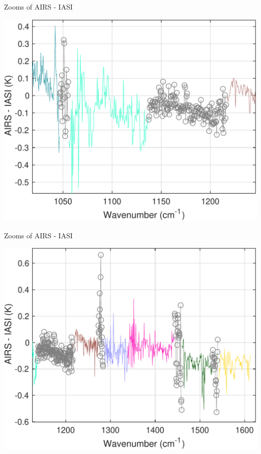 \documentclass[10pt,t]{beamer}
\begin{document}
\begin{frame}[label={sec:org53f6c55}]{Zooms of AIRS - IASI}
\begin{center}
\includegraphics[width=0.8\linewidth]{./Figs/Pdf/sno_airs_m_iasi_with_fill_lwzoom4.pdf}
\end{center}
\end{frame}
\begin{frame}[label={sec:org1c87cfb}]{Zooms of AIRS - IASI}
\begin{center}
\includegraphics[width=0.8\linewidth]{./Figs/Pdf/sno_airs_m_iasi_with_fill_mwzoom5.pdf}
\end{center}
\end{frame}
\end{document}
